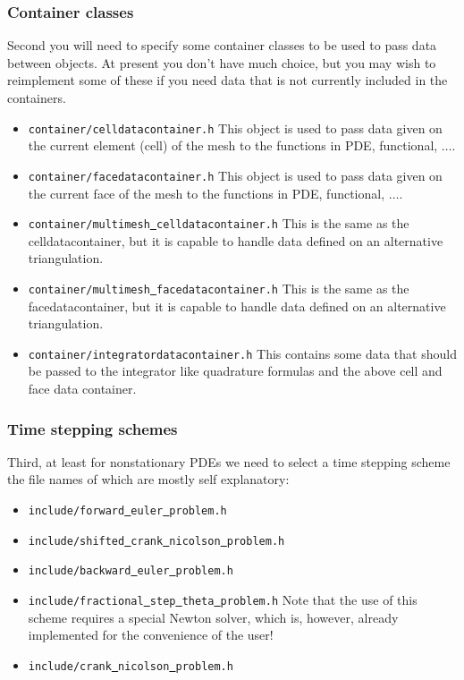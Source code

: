\documentclass[prodmode,acmtoms]{acmsmall}
\numberwithin{equation}{section}
\begin{document}
\subsubsection{Container classes}
Second you will need to specify some container classes to be used to 
pass data between objects. At present you don't have much choice, but you may wish 
to reimplement some of these if you need data that is not currently included in 
the containers.
\begin{itemize}
\item \texttt{container/celldatacontainer.h} This object is used to pass data 
  given on the current element (cell) of the mesh to the functions in PDE, functional, 
  $\ldots$. 
\item \texttt{container/facedatacontainer.h} This object is used to pass data 
  given on the current face of the mesh to the functions in PDE, functional, 
  $\ldots$. 
\item \texttt{container/multimesh\underline{ }celldatacontainer.h} This is the same as the 
  celldatacontainer, but it
  is capable to handle data defined on an alternative triangulation.
\item \texttt{container/multimesh\underline{ }facedatacontainer.h} This is the same as the
  facedatacontainer, but it
  is capable to handle data defined on an alternative triangulation.
\item \texttt{container/integratordatacontainer.h} This contains some data that 
  should be passed to the integrator like quadrature formulas and the above cell and 
  face data container.
\end{itemize}

\subsubsection{Time stepping schemes}
Third, at least for nonstationary PDEs we need to select a time stepping scheme
the file names of which are mostly self explanatory:
\begin{itemize}
\item \texttt{include/forward\underline{ }euler\underline{ }problem.h}
\item \texttt{include/shifted\underline{ }crank\underline{ }nicolson\underline{ }problem.h}
\item \texttt{include/backward\underline{ }euler\underline{ }problem.h}
\item \texttt{include/fractional\underline{ }step\underline{ }theta\underline{ }problem.h} Note that the use of this scheme requires a special Newton solver, which is, however, already
implemented for the convenience of the user!
\item \texttt{include/crank\underline{ }nicolson\underline{ }problem.h}
\end{itemize}
\end{document}
